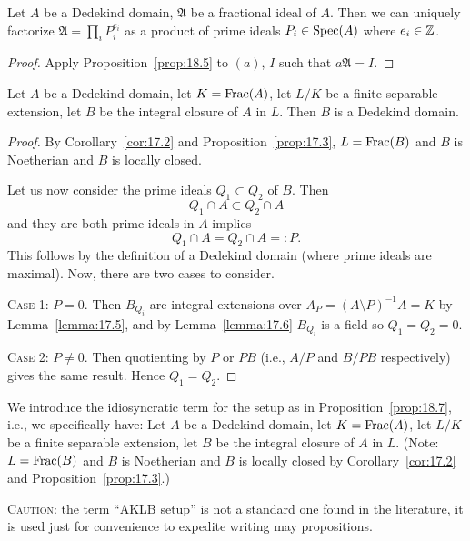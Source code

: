 
\lecture{}

\begin{corollary}\label{cor:18.6}
Let $A$ be a Dedekind domain, $\mathfrak{A}$ be a fractional ideal of
$A$. Then we can uniquely factorize $\mathfrak{A}=\prod_{i}P_{i}^{e_{i}}$
as a product of prime ideals $P_{i}\in\operatorname{Spec}(A)$ where $e_{i}\in\mathbb{Z}$.
\end{corollary}

\begin{proof}
Apply Proposition~\ref{prop:18.5} to $(a)$, $I$ such that $a\mathfrak{A}=I$.
\end{proof}

\begin{proposition}\label{prop:18.7}
Let $A$ be a Dedekind domain, let $K=\operatorname{Frac}(A)$, let $L/K$ be a finite
separable extension, let $B$ be the integral closure of $A$ in
$L$. Then $B$ is a Dedekind domain.
\end{proposition}

\begin{proof}
By Corollary~\ref{cor:17.2} and Proposition~\ref{prop:17.3}, $L=\operatorname{Frac}(B)$
and $B$ is Noetherian and $B$ is locally closed.


Let us now consider the prime ideals $Q_{1}\subset Q_{2}$ of $B$. Then
\begin{equation}
Q_{1}\cap A\subset Q_{2}\cap A
\end{equation}
and they are both prime ideals in $A$ implies
\begin{equation}
Q_{1}\cap A=Q_{2}\cap A=:P.
\end{equation}
This follows by the definition of a Dedekind domain (where prime
ideals are maximal). Now, there are two cases to consider.

\textsc{Case 1}: $P=0$. Then $B_{Q_{i}}$ are integral extensions over
$A_{P}=(A\setminus P)^{-1}A=K$ by Lemma~\ref{lemma:17.5}, and by
Lemma~\ref{lemma:17.6} $B_{Q_{i}}$ is a field so $Q_{1}=Q_{2}=0$.

\textsc{Case 2}: $P\neq0$. Then quotienting by $P$ or $PB$ (i.e.,
$A/P$ and $B/PB$ respectively) gives the same result. Hence $Q_{1}=Q_{2}$.
\end{proof}

\begin{definition}
We introduce the idiosyncratic term  for the setup
as in Proposition~\ref{prop:18.7}, i.e., we specifically have: Let $A$ be a Dedekind domain, let $K=\operatorname{Frac}(A)$, let $L/K$ be a finite
separable extension, let $B$ be the integral closure of $A$ in
$L$. (Note: $L=\operatorname{Frac}(B)$ and $B$ is Noetherian and $B$ is locally
closed by Corollary~\ref{cor:17.2} and Proposition~\ref{prop:17.3}.)

\textsc{Caution}: the term ``AKLB setup'' is not a standard one found
in the literature, it is used just for convenience to expedite writing
may propositions. 
\end{definition}

